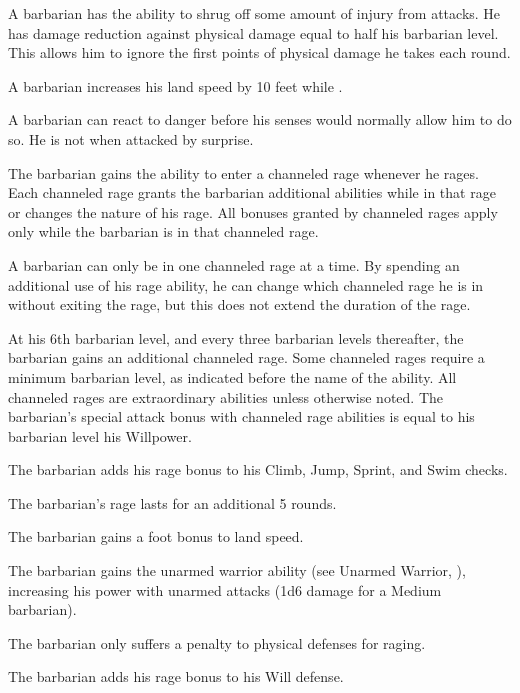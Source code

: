 A barbarian has the ability to shrug off some amount of injury from attacks.
He has damage reduction against physical damage equal to half his barbarian level.
This allows him to ignore the first points of physical damage he takes each round.

A barbarian increases his land speed by 10 feet while \unencumbered.

A barbarian can react to danger before his senses would normally allow him to do so.
He is not \unaware when attacked by surprise.

The barbarian gains the ability to enter a channeled rage whenever he rages.
Each channeled rage grants the barbarian additional abilities while in that rage or changes the nature of his rage.
All bonuses granted by channeled rages apply only while the barbarian is in that channeled rage.

A barbarian can only be in one channeled rage at a time.
By spending an additional use of his rage ability, he can change which channeled rage he is in without exiting the rage, but this does not extend the duration of the rage.

At his 6th barbarian level, and every three barbarian levels thereafter, the barbarian gains an additional channeled rage.
Some channeled rages require a minimum barbarian level, as indicated before the name of the ability.
All channeled rages are extraordinary abilities unless otherwise noted.
The barbarian's special attack bonus with channeled rage abilities is equal to his barbarian level \add his Willpower.

The barbarian adds his rage bonus to his Climb, Jump, Sprint, and Swim checks.

The barbarian's rage lasts for an additional 5 rounds.

The barbarian gains a  foot bonus to land speed.

The barbarian gains the unarmed warrior ability (see Unarmed Warrior, ), increasing his power with unarmed attacks (1d6 damage for a Medium barbarian).

The barbarian only suffers a  penalty to physical defenses for raging.

The barbarian adds his rage bonus to his Will defense.

